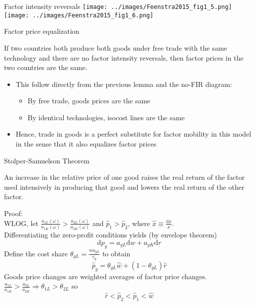 \documentclass[10pt,notes=hide]{beamer}
\begin{document}
\begin{frame}{Factor intensity reversals}
\texttt{[image: ../images/Feenstra2015\_fig1\_5.png]}
\texttt{[image: ../images/Feenstra2015\_fig1\_6.png]}
\end{frame}
\begin{frame}{Factor price equalization}
\begin{theorem}
If two countries both produce both goods under free trade with the same technology and there are no factor intensity reversals,
then factor prices in the two countries are the same.
\end{theorem}
\begin{itemize}
	\item This follow directly from the previous lemma and the no-FIR diagram:
	\begin{itemize}
		\item By free trade, goods prices are the same
		\item By identical technologies, isocost lines are the same
	\end{itemize}
	\item Hence, trade in goods is a perfect substitute for factor mobility in this model in the sense that it also equalizes factor prices
\end{itemize}
\end{frame}
\begin{frame}{Stolper-Samuelson Theorem}
\begin{theorem}
An increase in the relative price of one good raises the real return of the factor used intensively in producing that good and lowers the real return of the other factor.
\end{theorem}
Proof:\\
WLOG, let $\frac{a_{1L}(\omega)}{a_{1K}(\omega)}>\frac{a_{2L}(\omega)}{a_{2K}(\omega)}$
and $\hat{p}_{1}>\hat{p}_{2}$,
where $\hat{x} \equiv \frac{\textrm{d}x}{x}$. \\
Differentiating the zero-profit conditions yields (by envelope theorem)
\begin{equation*}
\textrm{d}p_{g}=a_{gL}\textrm{d}w+a_{gK}\textrm{d}r
\end{equation*}
Define the cost share $\theta _{gL}=\frac{wa_{gL}}{c_{g}}$
to obtain
\begin{equation*}
\hat{p}_{g}=\theta _{gL}\hat{w}+\left( 1-\theta _{gL}\right) \hat{r}
\end{equation*}
Goods price changes are weighted averages of factor price changes.
$\frac{a_{1L}}{a_{1K}}>\frac{a_{2L}}{a_{2K}} \Rightarrow \theta
_{1L}>\theta _{2L}$
so 
\begin{equation*}
\hat{r}<\hat{p}_{2}<\hat{p}_{1}<\hat{w}
\end{equation*}
\end{frame}
\end{document}
